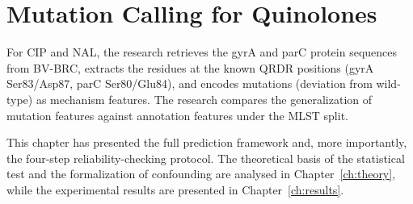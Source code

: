 \documentclass[../main.tex]{subfiles}
\begin{document}
\section{Mutation Calling for Quinolones}

For CIP and NAL, the research retrieves the gyrA and parC protein sequences from BV-BRC, extracts the residues at the known QRDR positions (gyrA Ser83/Asp87, parC Ser80/Glu84), and encodes mutations (deviation from wild-type) as mechanism features. The research compares the generalization of mutation features against annotation features under the MLST split.

This chapter has presented the full prediction framework and, more importantly, the four-step reliability-checking protocol. The theoretical basis of the statistical test and the formalization of confounding are analysed in Chapter~\ref{ch:theory}, while the experimental results are presented in Chapter~\ref{ch:results}.
\end{document}
